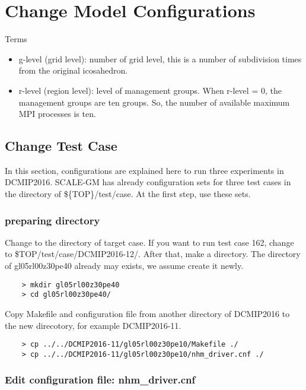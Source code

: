 \section{Change Model Configurations}
 {\sf Terms}
 \begin{itemize}
   \item g-level (grid level): number of grid level, this is a number of
         subdivision times from the original icosahedron.
   \item r-level (region level): level of management groups. When r-level = 0,
         the management groups are ten groups. So, the number of
         available maximum MPI processes is ten.
 \end{itemize}


\subsection{Change Test Case}
 \noindent In this section, configurations are explained here to run
 three experiments in DCMIP2016. SCALE-GM has already configuration sets
 for three test cases in the directory of \$\{TOP\}/test/case.
 At the first step, use these sets.

\subsubsection{preparing directory}
 Change to the directory of target case. If you want to run test case 162,
 change to \${TOP}/test/case/DCMIP2016-12/. After that, make a directory.
 The directory of gl05rl00z30pe40 already may exists, we assume create it newly.
 \begin{verbatim}
    > mkdir gl05rl00z30pe40
    > cd gl05rl00z30pe40/
 \end{verbatim}

 \noindent Copy Makefile and configuration file from another directory
 of DCMIP2016 to the new direcotory, for example DCMIP2016-11.
 \begin{verbatim}
    > cp ../../DCMIP2016-11/gl05rl00z30pe10/Makefile ./
    > cp ../../DCMIP2016-11/gl05rl00z30pe10/nhm_driver.cnf ./
 \end{verbatim}

\subsubsection{Edit configuration file: nhm\_driver.cnf}

